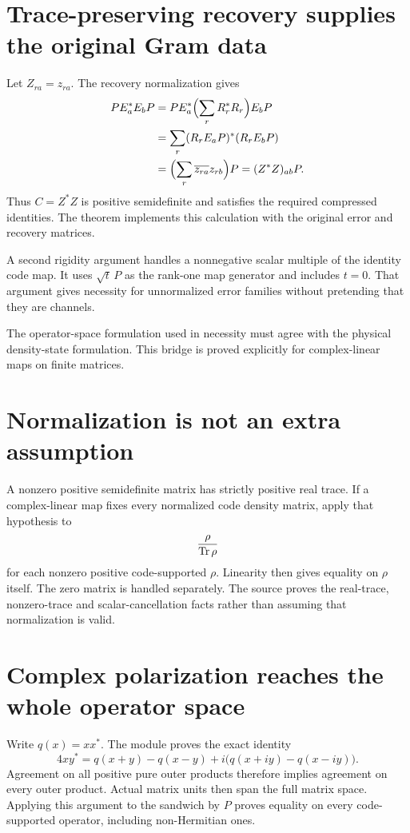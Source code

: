 \documentclass[10pt,letterpaper]{article}
\newcommand{\pageheading}[2]{\vspace*{2pt}{\small\color{ink}\textsc{#1}}\par\vspace{2pt}{\Large\bfseries #2}\par\vspace{4pt}}
\begin{document}
\section*{Trace-preserving recovery supplies the original Gram data}
Let $Z_{ra}=z_{ra}$. The recovery normalization gives
\begin{align*}
PE_a^*E_bP
&=PE_a^*\Bigl(\sum_rR_r^*R_r\Bigr)E_bP\\
&=\sum_r(R_rE_aP)^*(R_rE_bP)\\
&=\Bigl(\sum_r\overline{z_{ra}}z_{rb}\Bigr)P
=(Z^*Z)_{ab}P.
\end{align*}
Thus $C=Z^*Z$ is positive semidefinite and satisfies the required compressed identities. The theorem  implements this calculation with the original error and recovery matrices.

A second rigidity argument handles a nonnegative scalar multiple of the identity code map. It uses $\sqrt t\,P$ as the rank-one map generator and includes $t=0$. That argument gives necessity for unnormalized error families without pretending that they are channels.

\newpage
\pageheading{Physical-state bridge}{Density matrices, all operators and finite references}
The operator-space formulation used in necessity must agree with the physical density-state formulation. This bridge is proved explicitly for complex-linear maps on finite matrices.

\section*{Normalization is not an extra assumption}
A nonzero positive semidefinite matrix has strictly positive real trace. If a complex-linear map fixes every normalized code density matrix, apply that hypothesis to
\[
\frac{\rho}{\operatorname{Tr}\rho}
\]
for each nonzero positive code-supported $\rho$. Linearity then gives equality on $\rho$ itself. The zero matrix is handled separately. The source proves the real-trace, nonzero-trace and scalar-cancellation facts rather than assuming that normalization is valid.

\section*{Complex polarization reaches the whole operator space}
Write $q(x)=xx^*$. The module proves the exact identity
\[
4xy^*=q(x+y)-q(x-y)
+i\bigl(q(x+iy)-q(x-iy)\bigr).
\]
Agreement on all positive pure outer products therefore implies agreement on every outer product. Actual matrix units then span the full matrix space. Applying this argument to the sandwich by $P$ proves equality on every code-supported operator, including non-Hermitian ones.
\end{document}
